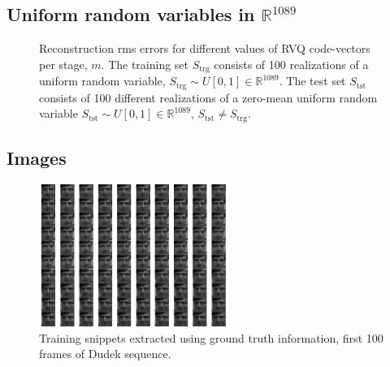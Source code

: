 \subsection{Uniform random variables in $\mathbb{R}^{1089}$}
								\begin{figure}[h]
								\centering
								\subtable{\begin{tiny}\end{tiny}}
								\caption{Reconstruction rms errors for different values of RVQ code-vectors per stage, $m$.  The training set $S_{\textrm{trg}}$ consists of 100 realizations of a uniform random variable, $S_{\textrm{trg}} \sim U[0, 1] \in \mathbb{R}^{1089}$.  The test set $S_{\textrm{tst}}$ consists of 100 different realizations of a zero-mean uniform random variable 	 $S_{\textrm{tst}} \sim U[0, 1] \in \mathbb{R}^{1089}$, $S_{\textrm{tst}} \neq S_{\textrm{trg}}$.}
								\label{fig:aRVQ_uniform_rand}
								\end{figure}

\clearpage
\newpage
\subsection{Images}
								\begin{figure}[h]
								\centering
								\includegraphics[width=0.55\textwidth]{thesis2/Dudek_snippets_frames_1_to_100.pdf}
								\caption{Training snippets extracted using ground truth information, first 100 frames of Dudek sequence.}
								\label{fig:Dudek_1_to_100}
								\end{figure}	

